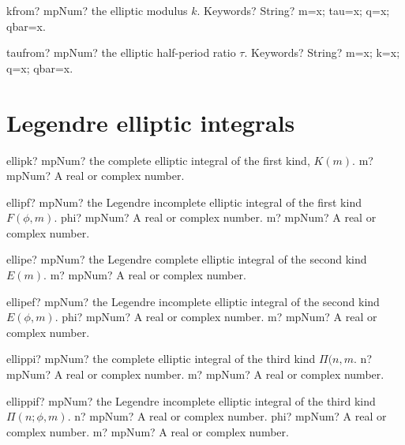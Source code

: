 \documentclass[12pt,a4paper,openany]{book}
\begin{document}
\begin{mpFunctionsExtract}
\mpFunctionOne
{kfrom? mpNum? the elliptic modulus $k$.}
{Keywords? String? m=x; tau=x; q=x; qbar=x.}
\end{mpFunctionsExtract}

\begin{mpFunctionsExtract}
\mpFunctionOne
{taufrom? mpNum? the elliptic half-period ratio $\tau$.}
{Keywords? String? m=x; k=x; q=x; qbar=x.}
\end{mpFunctionsExtract}

\section{Legendre elliptic integrals}

\begin{mpFunctionsExtract}
\mpFunctionOne
{ellipk? mpNum? the complete elliptic integral of the first kind, $K(m)$.}
{m? mpNum? A real or complex number.}
\end{mpFunctionsExtract}

\begin{mpFunctionsExtract}
\mpFunctionTwo
{ellipf? mpNum? the Legendre incomplete elliptic integral of the first kind $F(\phi,m)$.}
{phi? mpNum? A real or complex number.}
{m? mpNum? A real or complex number.}
\end{mpFunctionsExtract}

\begin{mpFunctionsExtract}
\mpFunctionOne
{ellipe? mpNum? the Legendre complete elliptic integral of the second kind $E(m)$.}
{m? mpNum? A real or complex number.}
\end{mpFunctionsExtract}

\begin{mpFunctionsExtract}
\mpFunctionTwo
{ellipef? mpNum? the Legendre incomplete elliptic integral of the second kind $E(\phi,m)$.}
{phi? mpNum? A real or complex number.}
{m? mpNum? A real or complex number.}
\end{mpFunctionsExtract}

\begin{mpFunctionsExtract}
\mpFunctionTwo
{ellippi? mpNum? the complete elliptic integral of the third kind $\Pi(n,m$.}
{n? mpNum? A real or complex number.}
{m? mpNum? A real or complex number.}
\end{mpFunctionsExtract}

\begin{mpFunctionsExtract}
\mpFunctionThree
{ellippif? mpNum? the Legendre incomplete elliptic integral of the third kind $\Pi(n;\phi,m)$.}
{n? mpNum? A real or complex number.}
{phi? mpNum? A real or complex number.}
{m? mpNum? A real or complex number.}
\end{mpFunctionsExtract}
\end{document}
